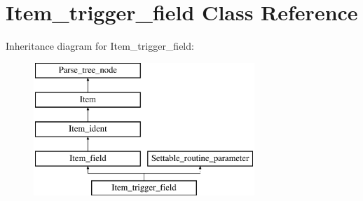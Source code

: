 \hypertarget{classItem__trigger__field}{}\section{Item\+\_\+trigger\+\_\+field Class Reference}
\label{classItem__trigger__field}
Inheritance diagram for Item\+\_\+trigger\+\_\+field\+:\begin{figure}[H]
\begin{center}
\leavevmode
\includegraphics[height=5.000000cm]{classItem__trigger__field}
\end{center}
\end{figure}
